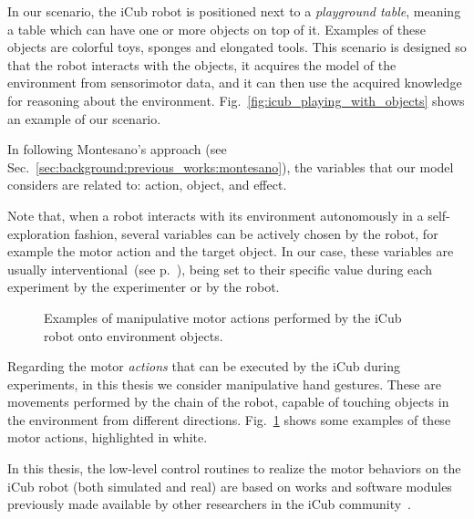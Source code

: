 In our scenario, the iCub robot is positioned next to a \emph{playground table}, meaning a table which can have one or more objects on top of it.
Examples of these objects are colorful toys, sponges and elongated tools.
This scenario is designed so that the robot interacts with the objects, it acquires the model of the environment from sensorimotor data, and it can then use the acquired knowledge for reasoning about the environment.
Fig.~\ref{fig:icub_playing_with_objects} shows an example of our scenario.

In following Montesano's approach (see Sec.~\ref{sec:background:previous_works:montesano}), the variables that our model considers are related to: action, object, and effect.

Note that, when a robot interacts with its environment autonomously in a self-exploration fashion, several variables can be actively chosen by the robot, for example the motor action and the target object.
In our case, these variables are usually interventional~(see p.~\pageref{para:interventional_vars}), being set to their specific value during each experiment by the experimenter or by the robot.

\begin{figure}
\centering
{} \quad
%
 \quad
%
%
\caption{Examples of manipulative motor actions performed by the iCub robot onto environment objects.}
\label{fig:icub_motor_actions}
\end{figure}

Regarding the motor \emph{actions} that can be executed by the iCub during experiments, in this thesis we consider manipulative hand gestures.
These are movements performed by the \armhand{} chain of the robot, capable of touching objects in the environment from different directions.
Fig.~\ref{fig:icub_motor_actions} shows some examples of these motor actions, highlighted in white.

In this thesis, the low-level control routines to realize the motor behaviors on the iCub robot (both simulated and real) are based on works and software modules previously made available by other researchers in the iCub community~\cite{pattacini:2010:iros,roncone:2016:rss}.

